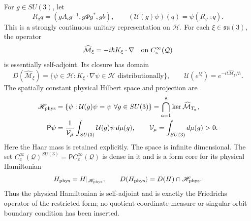 \begin{theorem}
\label{qh:hq-physical}
For \(g\in SU(3)\), let
\[
 R_gq=(gA_ig^{-1},g\Phi g^*,gb),\qquad
 (\mathcal U(g)\psi)(q)=\psi(R_{g^{-1}}q).
\]
This is a strongly continuous unitary representation on \(\mathscr H\).
For each \(\xi\in\mathfrak{su}(3)\), the operator
\[
 \widehat{\mathcal M}_\xi=-i\hbar K_\xi\cdot\nabla
                          \quad\hbox{on }C_c^\infty(\mathcal Q)
\]
is essentially self-adjoint. Its closure has domain
\[
 D(\widehat{\mathcal M}_\xi)
  =\{\psi\in\mathscr H:K_\xi\cdot\nabla\psi\in\mathscr H
                                      \text{ distributionally}\},
 \qquad
 \mathcal U(e^{t\xi})=e^{-it\widehat{\mathcal M}_\xi/\hbar}.
\]
The spatially constant physical Hilbert space and projection are
\begin{align}
 \mathscr H_{\rm phys}
  &=\{\psi:\mathcal U(g)\psi=\psi\ \forall g\in SU(3)\}
    =\bigcap_{a=1}^8\ker\widehat{\mathcal M}_{T_a},\notag\\
 \mathsf P\psi&=\frac1{\mathcal V_\mu}
       \int_{SU(3)}\mathcal U(g)\psi\,d\mu(g),\qquad
 \mathcal V_\mu=\int_{SU(3)}d\mu(g)>0 .\label{qh:hq-average}
\end{align}
Here the Haar mass is retained explicitly. The space is infinite
dimensional. The set \(C_c^\infty(\mathcal Q)^{SU(3)}
=\mathsf P C_c^\infty(\mathcal Q)\) is dense in it and is a form
core for its physical Hamiltonian
\[
 H_{\rm phys}=H|_{\mathscr H_{\rm phys}},\qquad
 D(H_{\rm phys})=D(H)\cap\mathscr H_{\rm phys}.
\]
Thus the physical Hamiltonian is self-adjoint and is exactly the
Friedrichs operator of the restricted form; no quotient-coordinate
measure or singular-orbit boundary condition has been inserted.
\end{theorem}
